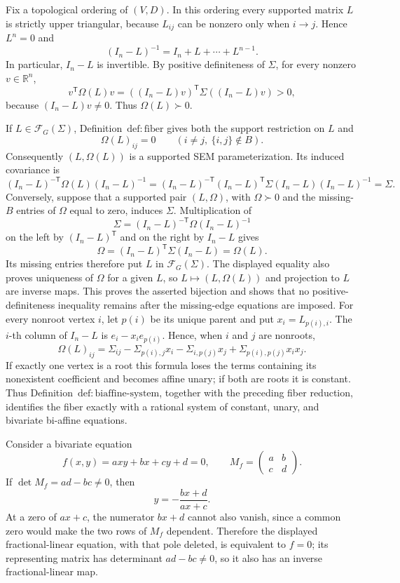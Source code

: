 Fix a topological ordering of \((V,D)\).  In this ordering every supported matrix \(L\) is strictly upper triangular, because \(L_{ij}\) can be nonzero only when \(i\to j\).  Hence \(L^n=0\) and
\[
(I_n-L)^{-1}=I_n+L+\cdots+L^{n-1}.
\]
In particular, \(I_n-L\) is invertible.  By positive definiteness of \(\Sigma\), for every nonzero \(v\in\mathbb R^n\),
\[
v^{\mathsf T}\Omega(L)v
=((I_n-L)v)^{\mathsf T}\Sigma((I_n-L)v)>0,
\]
because \((I_n-L)v\ne0\).  Thus \(\Omega(L)\succ0\).

If \(L\in\mathcal F_G(\Sigma)\), Definition~\(\mathrm{def:fiber}\) gives both the support restriction on \(L\) and
\[
\Omega(L)_{ij}=0\qquad(i\ne j,\ \{i,j\}\notin B).
\]
Consequently \((L,\Omega(L))\) is a supported SEM parameterization.  Its induced covariance is
\[
(I_n-L)^{-\mathsf T}\Omega(L)(I_n-L)^{-1}
=(I_n-L)^{-\mathsf T}(I_n-L)^{\mathsf T}\Sigma(I_n-L)(I_n-L)^{-1}
=\Sigma.
\]
Conversely, suppose that a supported pair \((L,\Omega)\), with \(\Omega\succ0\) and the missing-\(B\) entries of \(\Omega\) equal to zero, induces \(\Sigma\).  Multiplication of
\[
\Sigma=(I_n-L)^{-\mathsf T}\Omega(I_n-L)^{-1}
\]
on the left by \((I_n-L)^{\mathsf T}\) and on the right by \(I_n-L\) gives
\[
\Omega=(I_n-L)^{\mathsf T}\Sigma(I_n-L)=\Omega(L).
\]
Its missing entries therefore put \(L\) in \(\mathcal F_G(\Sigma)\).  The displayed equality also proves uniqueness of \(\Omega\) for a given \(L\), so \(L\mapsto(L,\Omega(L))\) and projection to \(L\) are inverse maps.  This proves the asserted bijection and shows that no positive-definiteness inequality remains after the missing-edge equations are imposed.
For every nonroot vertex \(i\), let \(p(i)\) be its unique parent and put \(x_i=L_{p(i),i}\).  The \(i\)-th column of \(I_n-L\) is \(e_i-x_i e_{p(i)}\).  Hence, when \(i\) and \(j\) are nonroots,
\[
\Omega(L)_{ij}
=\Sigma_{ij}-\Sigma_{p(i),j}x_i-\Sigma_{i,p(j)}x_j
+\Sigma_{p(i),p(j)}x_ix_j.
\]
If exactly one vertex is a root this formula loses the terms containing its nonexistent coefficient and becomes affine unary; if both are roots it is constant.  Thus Definition~\(\mathrm{def:biaffine\mbox{-}system}\), together with the preceding fiber reduction, identifies the fiber exactly with a rational system of constant, unary, and bivariate bi-affine equations.

Consider a bivariate equation
\[
f(x,y)=axy+bx+cy+d=0,
\qquad
M_f=\begin{pmatrix}a&b\\c&d\end{pmatrix}.
\]
If \(\det M_f=ad-bc\ne0\), then
\[
y=-\frac{bx+d}{ax+c}.
\]
At a zero of \(ax+c\), the numerator \(bx+d\) cannot also vanish, since a common zero would make the two rows of \(M_f\) dependent.  Therefore the displayed fractional-linear equation, with that pole deleted, is equivalent to \(f=0\); its representing matrix has determinant \(ad-bc\ne0\), so it also has an inverse fractional-linear map.

